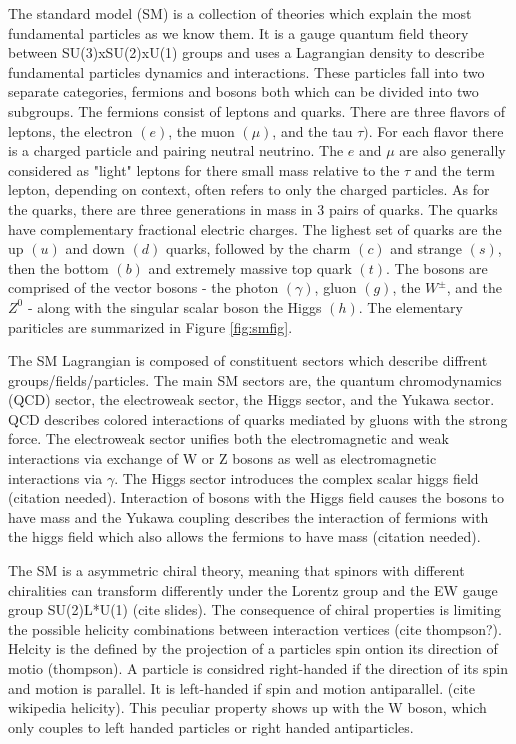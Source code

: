 The standard model (SM) is a collection of theories which explain the most fundamental particles as we know them. It is a gauge quantum field theory between SU(3)xSU(2)xU(1) groups and uses a Lagrangian density to describe fundamental particles  dynamics and interactions. These particles fall into two separate categories, fermions and bosons both which can be divided into two subgroups. The fermions consist of leptons and quarks. There are three flavors of leptons, the electron $(e)$, the muon $(\mu)$, and the tau $\tau)$. For each flavor there is a charged particle and pairing neutral neutrino. The $e$ and $\mu$ are also generally considered as "light" leptons for there small mass relative to the $\tau$ and the term lepton, depending on context, often refers to only the charged particles. As for the quarks, there are three generations in mass in 3 pairs of quarks. The quarks have complementary fractional electric charges. The lighest set of quarks are the up $(u)$ and down $(d)$ quarks, followed by the charm $(c)$ and strange $(s)$, then the bottom $(b)$ and extremely massive top quark $(t)$.  The bosons are comprised of the vector bosons - the photon $(\gamma)$, gluon $(g)$, the $W^\pm$, and the $Z^0$ - along with the singular scalar boson the Higgs $(h)$. The elementary pariticles are summarized in Figure \ref{fig:smfig}.



The SM Lagrangian is composed of constituent sectors which describe diffrent groups/fields/particles. The main SM sectors are, the quantum chromodynamics (QCD) sector, the electroweak sector, the Higgs sector, and the Yukawa sector. QCD describes colored interactions of quarks mediated by gluons with the strong force. The electroweak sector unifies both the electromagnetic and weak interactions via exchange of W or Z bosons as well as electromagnetic interactions via $\gamma$. The Higgs sector introduces the complex scalar higgs field (citation needed). Interaction of bosons with the Higgs field causes the bosons to have mass and the Yukawa coupling describes the interaction of fermions with the higgs field which also allows the fermions to have mass (citation needed).



The SM is a asymmetric chiral theory, meaning that spinors with different chiralities can
transform differently under the Lorentz group and the EW gauge group
SU(2)L*U(1) (cite slides).  The consequence of chiral properties is limiting the possible helicity combinations between interaction vertices (cite thompson?). Helcity is the defined by the projection of a particles spin ontion its direction of motio (thompson). A particle is considred right-handed if the direction of its spin and motion is parallel. It is left-handed if spin and motion antiparallel. (cite wikipedia helicity). This peculiar property shows up with the W boson, which only couples to left handed particles or right handed antiparticles.

